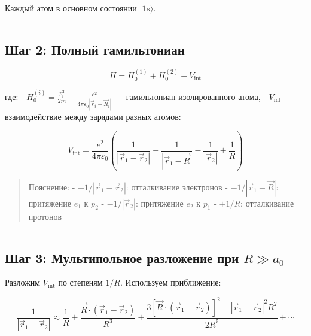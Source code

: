 \documentclass[11pt]{article}
\begin{document}
Каждый атом в основном состоянии \(|1s\rangle\).

\begin{center}\rule{0.5\linewidth}{\linethickness}\end{center}

\subsection{Шаг 2: Полный
гамильтониан}\label{ux448ux430ux433-2-ux43fux43eux43bux43dux44bux439-ux433ux430ux43cux438ux43bux44cux442ux43eux43dux438ux430ux43d}

\[
H = H_0^{(1)} + H_0^{(2)} + V_{\text{int}}
\]

где: -
\(H_0^{(i)} = \frac{p_i^2}{2m} - \frac{e^2}{4\pi\varepsilon_0 |\vec{r}_i - \vec{R}_i|}\)
--- гамильтониан изолированного атома, - \(V_{\text{int}}\) ---
взаимодействие между зарядами разных атомов:

\[
V_{\text{int}} = \frac{e^2}{4\pi\varepsilon_0} \left(
\frac{1}{|\vec{r}_1 - \vec{r}_2|} - \frac{1}{|\vec{r}_1 - \vec{R}|} - \frac{1}{|\vec{r}_2|} + \frac{1}{R}
\right)
\]

\begin{quote}
Пояснение: - \(+1/|\vec{r}_1 - \vec{r}_2|\): отталкивание электронов -
\(-1/|\vec{r}_1 - \vec{R}|\): притяжение \(e_1\) к \(p_2\) -
\(-1/|\vec{r}_2|\): притяжение \(e_2\) к \(p_1\) - \(+1/R\):
отталкивание протонов
\end{quote}

\begin{center}\rule{0.5\linewidth}{\linethickness}\end{center}

\subsection{\texorpdfstring{Шаг 3: Мультипольное разложение при
\(R \gg a_0\)}{Шаг 3: Мультипольное разложение при R \textbackslash{}gg a\_0}}\label{ux448ux430ux433-3-ux43cux443ux43bux44cux442ux438ux43fux43eux43bux44cux43dux43eux435-ux440ux430ux437ux43bux43eux436ux435ux43dux438ux435-ux43fux440ux438-r-gg-a_0}

Разложим \(V_{\text{int}}\) по степеням \(1/R\). Используем приближение:

\[
\frac{1}{|\vec{r}_1 - \vec{r}_2|} \approx \frac{1}{R} + \frac{\vec{R} \cdot (\vec{r}_1 - \vec{r}_2)}{R^3} + \frac{3[\vec{R} \cdot (\vec{r}_1 - \vec{r}_2)]^2 - |\vec{r}_1 - \vec{r}_2|^2 R^2}{2R^5} + \cdots
\]
\end{document}
